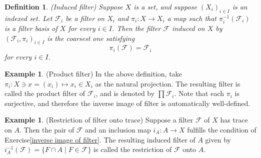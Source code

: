\documentclass[a4paper,12pt]{article}
\newtheorem{prp}[thm]{Proposition}
\newtheorem{dfn}[thm]{Definition}
\theoremstyle{remark}
\newtheorem*{prf}{Proof}
\theoremstyle{definition}
\theoremstyle{definition}
\newtheorem{ex}[thm]{Example}
\theoremstyle{definition}
\begin{document}

\begin{dfn} (Induced filter)
	Suppose \( X \) is a set, and suppose \( (X_i)_{i \in I} \) is an indexed set. Let \( \mathscr{F}_i \) be a filter on \( X_i \) and \( \pi_i:X \to X_i \) a map such that \( \pi_i ^{-1}(\mathscr{F}_i) \) is a filter basis of \( X \) for every \( i \in I \). Then the filter \( \mathscr{F} \) induced on \( X \) by \( (\mathscr{F}_i ,\pi_i)_{i \in I} \) is the coarsest one satisfying
	\begin{equation*}
		\pi_i(\mathscr{F}) = \mathscr{F}_i
	\end{equation*}
	for every \( i \in I \).
\end{dfn}

\begin{ex} (Product filter)
	In the above definition, take \( \pi_i :X \ni x = (x_i) \mapsto x_i \in X_i \) as the natural projection. The resulting filter is called the product filter of \( \mathscr{F}_i \), and is denoted by \( \prod \mathscr{F}_i \). Note that each \( \pi_i \) is surjective, and therefore the inverse image of filter is automatically well-defined.
\end{ex}

\begin{ex} (Restriction of filter onto trace)
	Suppose a filter \( \mathscr{F} \) of \( X \) has trace on \( A \). Then the pair of \( \mathscr{F} \) and an inclusion map \( i_A:A \to X \) fulfills the condition of Exercise\ref{inverse image of filter}. The resulting induced filter of \( A \) given by \(i_A^{-1}(\mathscr{F}) =\{F \cap A \mid F \in \mathscr{F}\} \) is called the restriction of \( \mathscr{F} \) onto \( A \).
\end{ex}
\end{document}
